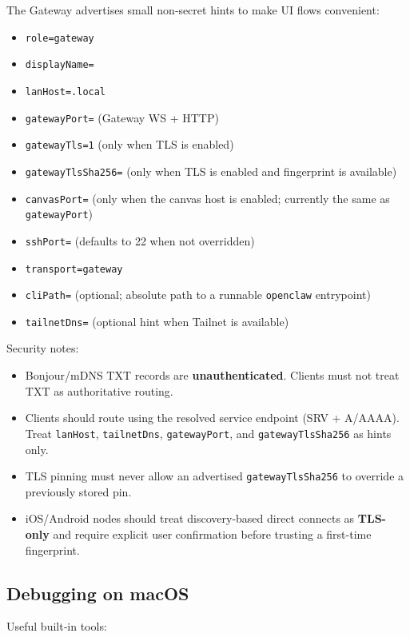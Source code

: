 The Gateway advertises small non‑secret hints to make UI flows convenient:

\begin{itemize}
  \item \texttt{role=gateway}
  \item \texttt{displayName=}
  \item \texttt{lanHost=.local}
  \item \texttt{gatewayPort=} (Gateway WS + HTTP)
  \item \texttt{gatewayTls=1} (only when TLS is enabled)
  \item \texttt{gatewayTlsSha256=} (only when TLS is enabled and fingerprint is available)
  \item \texttt{canvasPort=} (only when the canvas host is enabled; currently the same as \texttt{gatewayPort})
  \item \texttt{sshPort=} (defaults to 22 when not overridden)
  \item \texttt{transport=gateway}
  \item \texttt{cliPath=} (optional; absolute path to a runnable \texttt{openclaw} entrypoint)
  \item \texttt{tailnetDns=} (optional hint when Tailnet is available)
\end{itemize}


Security notes:

\begin{itemize}
  \item Bonjour/mDNS TXT records are \textbf{unauthenticated}. Clients must not treat TXT as authoritative routing.
  \item Clients should route using the resolved service endpoint (SRV + A/AAAA). Treat \texttt{lanHost}, \texttt{tailnetDns}, \texttt{gatewayPort}, and \texttt{gatewayTlsSha256} as hints only.
  \item TLS pinning must never allow an advertised \texttt{gatewayTlsSha256} to override a previously stored pin.
  \item iOS/Android nodes should treat discovery-based direct connects as \textbf{TLS-only} and require explicit user confirmation before trusting a first-time fingerprint.
\end{itemize}


\subsection{Debugging on macOS}


Useful built‑in tools:

